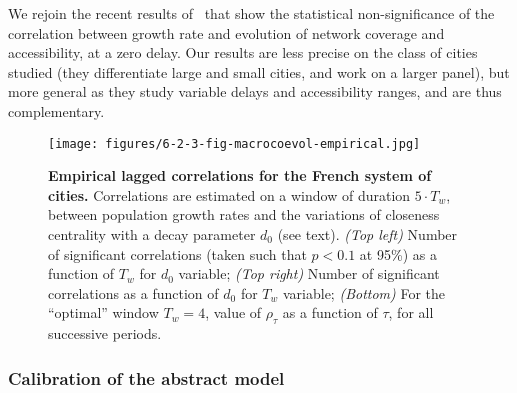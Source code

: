 

We rejoin the recent results of~\cite{mimeur:hal-01616746} that show the statistical non-significance of the correlation between growth rate and evolution of network coverage and accessibility, at a zero delay. Our results are less precise on the class of cities studied (they differentiate large and small cities, and work on a larger panel), but more general as they study variable delays and accessibility ranges, and are thus complementary.


\begin{figure}
	\texttt{[image: figures/6-2-3-fig-macrocoevol-empirical.jpg]}
	\caption[Empirical lagged correlations for the French system of cities]{\textbf{Empirical lagged correlations for the French system of cities.} Correlations are estimated on a window of duration $5\cdot T_w$, between population growth rates and the variations of closeness centrality with a decay parameter $d_0$ (see text). \textit{(Top left)} Number of significant correlations (taken such that $p<0.1$ at 95\%) as a function of $T_w$ for $d_0$ variable; \textit{(Top right)} Number of significant correlations as a function of $d_0$ for $T_w$ variable; \textit{(Bottom)} For the ``optimal'' window $T_w = 4$, value of $\rho_{\tau}$ as a function of $\tau$, for all successive periods.\label{fig:macrocoevol:empirical}}
\end{figure}


\subsubsection{Calibration of the abstract model}



